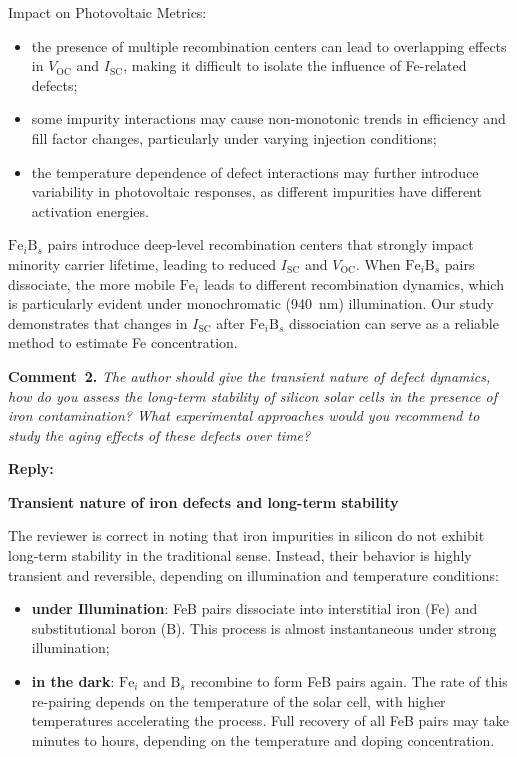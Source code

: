 \documentclass[a4paper,fleqn]{cas-sc}
\begin{document}
Impact on Photovoltaic Metrics:
\begin{itemize}
    \item the presence of multiple recombination centers can lead to overlapping effects in $V_\mathrm{OC}$ and $I_\mathrm{SC}$, making it difficult to isolate the influence of Fe-related defects;
    \item some impurity interactions may cause non-monotonic trends in efficiency and fill factor changes, particularly under varying injection conditions;
    \item the temperature dependence of defect interactions may further introduce variability in photovoltaic responses, as different impurities have different activation energies.
\end{itemize}


$\mathrm{Fe}_i\mathrm{B}_s$ pairs introduce deep-level recombination centers that strongly impact minority carrier lifetime, leading to reduced $I_\mathrm{SC}$ and $V_\mathrm{OC}$. When $\mathrm{Fe}_i\mathrm{B}_s$ pairs dissociate, the more mobile $\mathrm{Fe}_i$ leads to different recombination dynamics, which is particularly evident under monochromatic (940~nm) illumination. Our study demonstrates that changes in $I_\mathrm{SC}$ after $\mathrm{Fe}_i\mathrm{B}_s$ dissociation can serve as a reliable method to estimate Fe concentration.

\vspace{1cm}
\noindent
\textcolor[rgb]{0.00,0.50,1.00}{\textbf{Comment~2.}}
\emph{ The author should give the transient nature of defect dynamics, how do you assess the long-term stability of silicon solar cells in the presence of iron contamination? What experimental approaches would you recommend to study the aging effects of these defects over time?}

\noindent
\textcolor[rgb]{0.51,0.00,0.00}{\textbf{Reply:}}

\textbf{Transient nature of iron defects and long-term stability}

The reviewer is correct in noting that iron impurities in silicon do not exhibit long-term stability in the traditional sense. Instead, their behavior is highly transient and reversible, depending on illumination and temperature conditions:

\begin{itemize}
    \item \textbf{under Illumination}: FeB pairs dissociate into interstitial iron (Fe) and substitutional boron (B). This process is almost instantaneous under strong illumination;
    \item \textbf{in the dark}: $\mathrm{Fe}_i$ and $\mathrm{B}_s$ recombine to form FeB pairs again. The rate of this re-pairing depends on the temperature of the solar cell, with higher temperatures accelerating the process. Full recovery of all FeB pairs may take minutes to hours, depending on the temperature and doping concentration.
\end{itemize}
\end{document}
